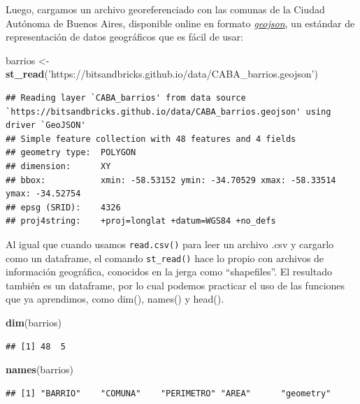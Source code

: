 \documentclass[]{book}
\newenvironment{Shaded}{\begin{snugshade}}{\end{snugshade}}
\newcommand{\KeywordTok}[1]{\textcolor[rgb]{0.13,0.29,0.53}{\textbf{#1}}}
\newcommand{\StringTok}[1]{\textcolor[rgb]{0.31,0.60,0.02}{#1}}
\newcommand{\NormalTok}[1]{#1}
\begin{document}
Luego, cargamos un archivo georeferenciado con las comunas de la Ciudad
Autónoma de Buenos Aires, disponible online en formato
\href{https://es.wikipedia.org/wiki/GeoJSON}{\emph{geojson}}, un
estándar de representación de datos geográficos que es fácil de usar:

\begin{Shaded}
\begin{Highlighting}[]
\NormalTok{barrios <-}\StringTok{ }\KeywordTok{st_read}\NormalTok{(}\StringTok{'https://bitsandbricks.github.io/data/CABA_barrios.geojson'}\NormalTok{)}
\end{Highlighting}
\end{Shaded}

\begin{verbatim}
## Reading layer `CABA_barrios' from data source `https://bitsandbricks.github.io/data/CABA_barrios.geojson' using driver `GeoJSON'
## Simple feature collection with 48 features and 4 fields
## geometry type:  POLYGON
## dimension:      XY
## bbox:           xmin: -58.53152 ymin: -34.70529 xmax: -58.33514 ymax: -34.52754
## epsg (SRID):    4326
## proj4string:    +proj=longlat +datum=WGS84 +no_defs
\end{verbatim}

Al igual que cuando usamos \texttt{read.csv()} para leer un archivo .csv
y cargarlo como un dataframe, el comando \texttt{st\_read()} hace lo
propio con archivos de información geográfica, conocidos en la jerga
como ``shapefiles''. El resultado también es un dataframe, por lo cual
podemos practicar el uso de las funciones que ya aprendimos, como dim(),
names() y head().

\begin{Shaded}
\begin{Highlighting}[]
\KeywordTok{dim}\NormalTok{(barrios)}
\end{Highlighting}
\end{Shaded}

\begin{verbatim}
## [1] 48  5
\end{verbatim}

\begin{Shaded}
\begin{Highlighting}[]
\KeywordTok{names}\NormalTok{(barrios)}
\end{Highlighting}
\end{Shaded}

\begin{verbatim}
## [1] "BARRIO"    "COMUNA"    "PERIMETRO" "AREA"      "geometry"
\end{verbatim}
\end{document}
